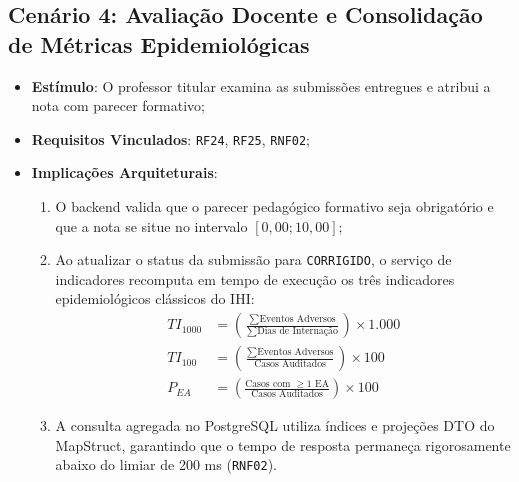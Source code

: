 \subsection{Cenário 4: Avaliação Docente e Consolidação de Métricas Epidemiológicas}
\label{subsec_cenario_avaliacao}
\begin{itemize}
    \item \textbf{Estímulo}: O professor titular examina as submissões entregues e atribui a nota com parecer formativo;
    \item \textbf{Requisitos Vinculados}: \texttt{RF24}, \texttt{RF25}, \texttt{RNF02};
    \item \textbf{Implicações Arquiteturais}:
    \begin{enumerate}
        \item O backend valida que o parecer pedagógico formativo seja obrigatório e que a nota se situe no intervalo $[0,00; 10,00]$;
        \item Ao atualizar o status da submissão para \texttt{CORRIGIDO}, o serviço de indicadores recomputa em tempo de execução os três indicadores epidemiológicos clássicos do IHI:
        \begin{align}
            TI_{1000} &= \left( \frac{\sum \text{Eventos Adversos}}{\sum \text{Dias de Internação}} \right) \times 1.000 \\
            TI_{100}  &= \left( \frac{\sum \text{Eventos Adversos}}{\text{Casos Auditados}} \right) \times 100 \\
            P_{EA}    &= \left( \frac{\text{Casos com } \ge 1 \text{ EA}}{\text{Casos Auditados}} \right) \times 100
        \end{align}
        \item A consulta agregada no PostgreSQL utiliza índices e projeções DTO do MapStruct, garantindo que o tempo de resposta permaneça rigorosamente abaixo do limiar de 200 ms (\texttt{RNF02}).
    \end{enumerate}
\end{itemize}
